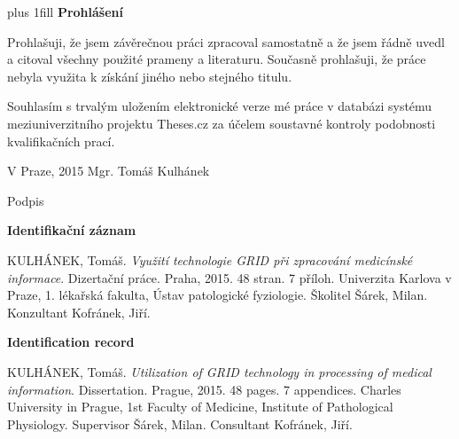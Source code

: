 
\newpage
\vglue 0pt plus 1fill
\noindent\Large \textbf{Prohlášení}

\normalsize
\noindent Prohlašuji, že jsem závěrečnou práci zpracoval samostatně a že jsem řádně uvedl a citoval všechny použité prameny a literaturu. Současně prohlašuji, že práce nebyla využita k získání jiného nebo stejného titulu.

\vspace{5mm}
\noindent Souhlasím s trvalým uložením elektronické verze mé práce v databázi systému meziuniverzitního projektu Theses.cz za účelem soustavné kontroly podobnosti kvalifikačních prací.


\vspace{15mm}

V Praze, 2015 \hfill          Mgr. Tomáš Kulhánek
\vspace{10mm}
					
\hfill Podpis

\vspace{20mm}

\newpage
\mbox{}
\newpage
\noindent\Large\textbf{Identifikační záznam}

\normalsize
\noindent
KULHÁNEK, Tomáš. \emph{Využití technologie GRID při zpracování medicínské informace}. Dizertační práce. Praha, 2015. 48 stran. 7 příloh. Univerzita Karlova v Praze, 1. lékařská fakulta, Ústav patologické fyziologie. Školitel Šárek, Milan. Konzultant Kofránek, Jiří.

\vspace{10mm}

\noindent\Large\textbf{Identification record}

\normalsize
\noindent
KULHÁNEK, Tomáš. \emph{Utilization of GRID technology in processing of medical information}. Dissertation. Prague, 2015. 48 pages. 7 appendices. Charles University in Prague, 1st Faculty of Medicine, Institute of Pathological Physiology. Supervisor Šárek, Milan. Consultant Kofránek, Jiří.

\newpage
\mbox{}


